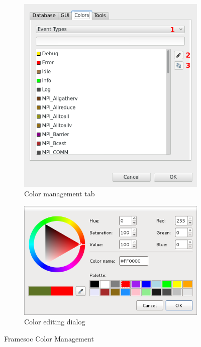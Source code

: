 \documentclass[twoside]{article}
\begin{document}
\begin{sloppypar}
\begin{figure}[h!]
  \centering
  \begin{subfigure}[c]{0.46\textwidth}
    \includegraphics[width=1.0\textwidth]{images/pref_color.png}
    \caption{Color management tab}
    \label{fig:color_type_list_MPI}
  \end{subfigure}%
  \hspace{30pt}
  \begin{subfigure}[c]{0.46\textwidth}
    \includegraphics[width=1.0\textwidth]{images/color_editing.png}
    \caption{Color editing dialog}
    \label{fig:color_editing}       
  \end{subfigure}%
  \caption{Framesoc Color Management}
  \label{fig:colors}       
\end{figure}


\end{sloppypar}
\end{document}
